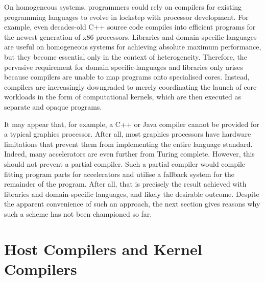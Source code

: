     On homogeneous systems, programmers could rely on compilers for existing
    programming languages to evolve in lockstep with processor development.
    For example, even decades-old C++ source code compiles into efficient
    programs for the newest generation of x86 processors.
    Libraries and domain-specific languages are useful on homogeneous systems
    for achieving absolute maximum performance, but they become essential only
    in the context of heterogeneity.
    Therefore, the pervasive requirement for domain specific-languages and
    libraries only arises because compilers are unable to map programs onto
    specialised cores.
    Instead, compilers are increasingly downgraded to merely coordinating the
    launch of core workloads in the form of computational kernels, which are
    then executed as separate and opaque programs.

    It may appear that, for example, a C++ or Java compiler cannot
    be provided for a typical graphics processor.
    After all, most graphics processors have hardware limitations that prevent
    them from implementing the entire language standard.
    Indeed, many accelerators are even further from Turing complete.
    However, this should not prevent a partial compiler.
    Such a partial compiler would compile fitting program parts for accelerators
    and utilise a fallback system for the remainder of the program.
    After all, that is precisely the result achieved with libraries and
    domain-specific languages, and likely the desirable outcome.
    Despite the apparent convenience of such an approach, the next section gives
    reasons why such a scheme has not been championed so far.

\section{Host Compilers and Kernel Compilers}
\label{sec:hostkernel}

